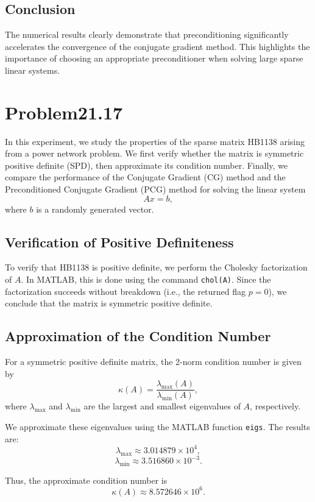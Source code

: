 \documentclass{article}
\begin{document}
\subsection{Conclusion}

The numerical results clearly demonstrate that preconditioning significantly accelerates the convergence of the conjugate gradient method. This highlights the importance of choosing an appropriate preconditioner when solving large sparse linear systems.
\newpage
\section{Problem21.17}

In this experiment, we study the properties of the sparse matrix HB1138 arising from a power network problem. We first verify whether the matrix is symmetric positive definite (SPD), then approximate its condition number. Finally, we compare the performance of the Conjugate Gradient (CG) method and the Preconditioned Conjugate Gradient (PCG) method for solving the linear system
\[
  Ax = b,
\]
where $b$ is a randomly generated vector.

\subsection{Verification of Positive Definiteness}

To verify that HB1138 is positive definite, we perform the Cholesky factorization of $A$.
In MATLAB, this is done using the command \texttt{chol(A)}.
Since the factorization succeeds without breakdown (i.e., the returned flag $p = 0$),
we conclude that the matrix is symmetric positive definite.

\subsection{Approximation of the Condition Number}

For a symmetric positive definite matrix, the 2-norm condition number is given by
\[
  \kappa(A) = \frac{\lambda_{\max}(A)}{\lambda_{\min}(A)},
\]
where $\lambda_{\max}$ and $\lambda_{\min}$ are the largest and smallest eigenvalues of $A$, respectively.

We approximate these eigenvalues using the MATLAB function \texttt{eigs}. The results are:
\[
  \lambda_{\max} \approx 3.014879 \times 10^4,
\]
\[
  \lambda_{\min} \approx 3.516860 \times 10^{-3}.
\]

Thus, the approximate condition number is
\[
  \kappa(A) \approx 8.572646 \times 10^6.
\]
\end{document}
